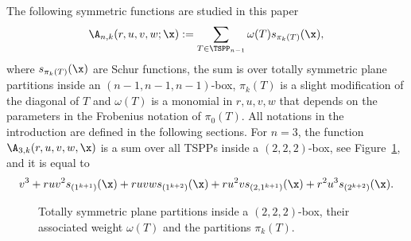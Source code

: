 The following symmetric functions are studied in this paper
\[
\A_{n,k}(r,u,v,w; \x) := \sum_{T \in \TSPP_{n-1}} \omega(T) s_{\pi_k(T)}(\x),
\]
where $s_{\pi_k(T)}(\x)$ are Schur functions,
the sum is over totally symmetric plane partitions inside an $(n-1,n-1,n-1)$-box, $\pi_k(T)$ is a slight modification of the diagonal of $T$ and $\omega(T)$ is a monomial in $r,u,v,w$ that depends on the parameters in the Frobenius notation of $\pi_0(T)$.
All notations in the introduction are defined in the following sections. For $n=3$, the function $\A_{3,k}(r,u,v,w,\x)$ is a sum over all TSPPs inside a $(2,2,2)$-box, see Figure~\ref{fig: Example for Ank}, and it is equal to
\[
v^3 + r  u v^2 s_{(1^{k+1})}(\x) + r  uv w s_{(1^{k+2})}(\x) + r  u^2 v  s_{(2,1^{k+1})}(\x) + r^2u^3 s_{(2^{k+2})}(\x).
\]

\begin{figure}
\begin{center}
\end{center}
\caption{\label{fig: Example for Ank} Totally symmetric plane partitions inside a $(2,2,2)$-box, their associated weight $\omega(T)$ and the partitions $\pi_k(T)$.}
\end{figure}

